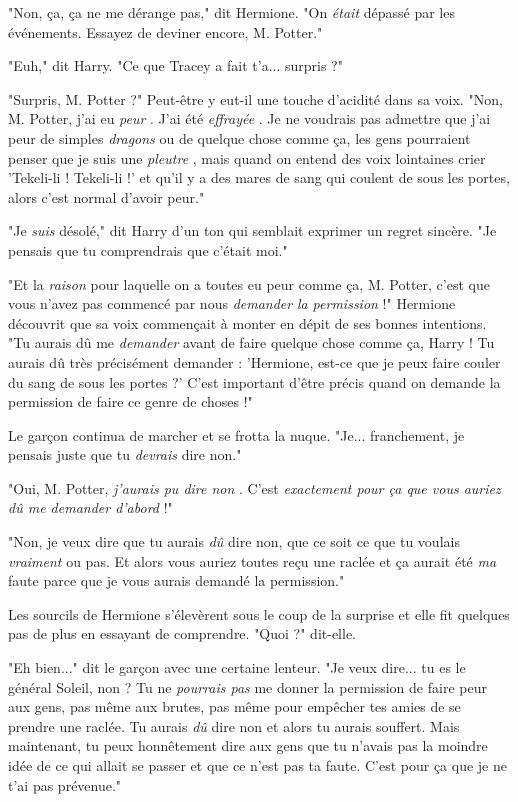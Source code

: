 "Non, ça, ça ne me dérange pas," dit Hermione. "On \emph{était}  dépassé par les événements. Essayez de deviner encore, M. Potter."

"Euh," dit Harry. "Ce que Tracey a fait t'a... surpris ?"

"Surpris, M. Potter ?" Peut-être y eut-il une touche d'acidité dans sa voix. "Non, M. Potter, j'ai eu \emph{peur} . J'ai été \emph{effrayée} . Je ne voudrais pas admettre que j'ai peur de simples \emph{dragons}  ou de quelque chose comme ça, les gens pourraient penser que je suis une \emph{pleutre} , mais quand on entend des voix lointaines crier 'Tekeli-li ! Tekeli-li !' et qu'il y a des mares de sang qui coulent de sous les portes, alors c'est normal d'avoir peur."

"Je \emph{suis}  désolé," dit Harry d'un ton qui semblait exprimer un regret sincère. "Je pensais que tu comprendrais que c'était moi."

"Et la \emph{raison}  pour laquelle on a toutes eu peur comme ça, M. Potter, c'est que vous n'avez pas commencé par nous \emph{demander}  \emph{la permission} !" Hermione découvrit que sa voix commençait à monter en dépit de ses bonnes intentions. "Tu aurais dû me \emph{demander}  avant de faire quelque chose comme ça, Harry ! Tu aurais dû très précisément demander : 'Hermione, est-ce que je peux faire couler du sang de sous les portes ?' C'est important d'être précis quand on demande la permission de faire ce genre de choses !"

Le garçon continua de marcher et se frotta la nuque. "Je... franchement, je pensais juste que tu \emph{devrais}  dire non."

"Oui, M. Potter, \emph{j'aurais pu dire non} . C'est \emph{exactement pour ça que vous auriez dû me demander d'abord}  !"

"Non, je veux dire que tu aurais \emph{dû}  dire non, que ce soit ce que tu voulais \emph{vraiment } ou pas. Et alors vous auriez toutes reçu une raclée et ça aurait été \emph{ma}  faute parce que je vous aurais demandé la permission."

Les sourcils de Hermione s'élevèrent sous le coup de la surprise et elle fit quelques pas de plus en essayant de comprendre. "Quoi ?" dit-elle.

"Eh bien..." dit le garçon avec une certaine lenteur. "Je veux dire... tu es le général Soleil, non ? Tu ne \emph{pourrais pas}  me donner la permission de faire peur aux gens, pas même aux brutes, pas même pour empêcher tes amies de se prendre une raclée. Tu aurais \emph{dû}  dire non et alors tu aurais souffert. Mais maintenant, tu peux honnêtement dire aux gens que tu n'avais pas la moindre idée de ce qui allait se passer et que ce n'est pas ta faute. C'est pour ça que je ne t'ai pas prévenue."

